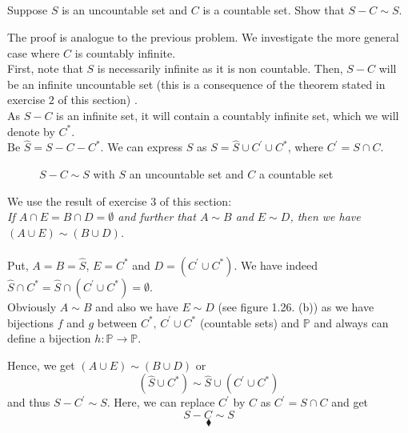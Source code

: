 \subsection{}
\begin{tcolorbox}
Suppose $S$ is an uncountable set and $C$ is a countable set. Show that $S - C\sim S$. 
\end{tcolorbox}

The proof is analogue to the previous problem. 
We investigate the more general case where $C$ is countably infinite.\\
First, note that $S$ is necessarily infinite as it is non countable. Then, $S - C$ will be an infinite uncountable set (this is a consequence of the theorem stated in exercise $2$ of this section) . \\
As $S - C$ is an  infinite set, it will contain a countably infinite set, which we will denote by $C^*$. \\
Be $\hat{S}= S-C-C^{*}$. We can express $S$ as $S=\hat{S}\cup C^{'}\cup C^{*}$, where $C^{'}= S\cap C$.

\begin{figure}[H]%
    \centering
    \subfloat[$\hat{S}= S-C-C^{*}$]{}
\caption{$S - C\sim S$ with $S$ an uncountable set and $C$ a countable set}
\label{fig:fig_p3}
\end{figure}
We use the result of exercise $3$ of this section:\\
\textit{If $A \cap E = B\cap D=\emptyset$ and further that $A\sim  B$ and $E\sim  D$, then we have  $(A \cup E) \sim (B\cup  D)$.\\}\\
Put, $A= B=\hat{S}$, $ E= C^{*}$ and $D=  (C^{'}\cup C^*)$. We have indeed $\hat{S}\cap C^*= \hat{S}\cap (C^{'}\cup C^*)=\emptyset$.\\
Obviously $A\sim B$ and also we have $E\sim D$ (see figure 1.26. (b)) as we have bijections $f$ and $g$ between $C^*,\,  C^{'}\cup C^*$ (countable sets) and $\mathbb{P}$ and always can define a bijection $h:\mathbb{P}\rightarrow \mathbb{P}$.

Hence, we get $(A \cup E) \sim (B\cup  D)$ or
$$(\hat{S} \cup C^{*}) \sim \hat{S}\cup  (C^{'}\cup C^*)$$
and thus $S-C^{'} \sim S$. Here, we can replace $C^{'}$ by $C$ as $C^{'}= S\cap C$ and get 
$$S-C^{} \sim S$$
$$\blacklozenge$$


